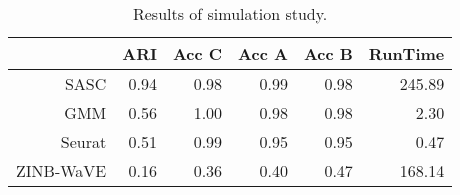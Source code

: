 \begin{table}[ht]
\centering
\begin{tabular}{rrrrrr}
  \hline
 & ARI & Acc C & Acc A & Acc B & RunTime \\ 
  \hline
SASC & 0.94 & 0.98 & 0.99 & 0.98 & 245.89 \\ 
  GMM & 0.56 & 1.00 & 0.98 & 0.98 & 2.30 \\ 
  Seurat & 0.51 & 0.99 & 0.95 & 0.95 & 0.47 \\ 
  ZINB-WaVE & 0.16 & 0.36 & 0.40 & 0.47 & 168.14 \\ 
   \hline
\end{tabular}
\caption{Results of simulation study.} 
\label{table:sim_results}
\end{table}
